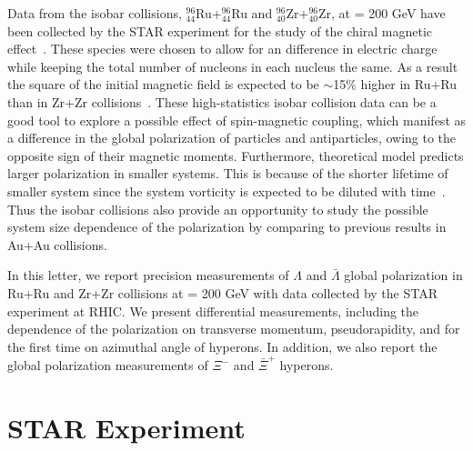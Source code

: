 \documentclass[preprint,5p,times,twocolumn]{elsarticle}
\begin{document}
Data from the isobar collisions, $^{96}_{44}$Ru+$^{96}_{44}$Ru and $^{96}_{40}$Zr+$^{96}_{40}$Zr, at \snn = 200 GeV have been collected by the STAR experiment for the study of the chiral magnetic effect~\cite{STAR:2021mii}.  
These species were chosen to allow for an difference in electric charge while keeping the total number of nucleons in each nucleus the same. 
As a result the square of the initial magnetic field is expected to be $\sim$15\% higher in Ru+Ru than in Zr+Zr collisions~\cite{Voloshin:2010ut,Deng:2016knn}.
These high-statistics isobar collision data can be a good tool to explore a possible effect of spin-magnetic coupling, 
which manifest as a difference in the global polarization of particles and antiparticles, owing to the opposite sign of their magnetic moments. 
Furthermore, theoretical model predicts larger polarization in smaller systems. This is because of the shorter lifetime of smaller system since the system vorticity is expected to be diluted with time~\cite{Shi:2017wpk,Alzhrani:2022dpi}. Thus the isobar collisions also provide an opportunity to study the possible system size dependence of the polarization by comparing to previous results in Au+Au collisions.

In this letter, we report precision measurements of $\Lambda$ and $\bar\Lambda$ global polarization in Ru+Ru and Zr+Zr collisions at \snn = 200 GeV with data collected by the STAR experiment at RHIC. 
We present differential measurements, including the dependence of the polarization on transverse momentum, pseudorapidity, and for the first time on azimuthal angle of hyperons.
In addition, we also report the global polarization measurements of $\Xi^-$ and $\bar \Xi^+$ hyperons.

\section{STAR Experiment}
\end{document}
